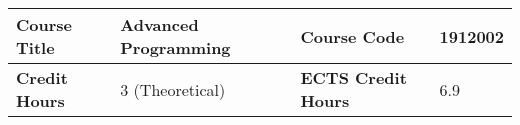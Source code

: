 \documentclass[12pt]{article}
\begin{document}
\begin{minipage}{\textwidth}
\begin{tabularx}{\textwidth}{|l|X|}
\begin{minipage}{.70\textwidth}
					\vspace{3mm}
					\end{minipage} \\ \hline
\end{tabularx}
\end{minipage}


\bigskip
\bigskip



\begin{minipage}{\textwidth}
\begin{tabularx}{\textwidth}{|l|X|l|X|}
\hline
\textbf{Course Title}       &  Advanced Programming & \textbf{Course Code}       &  1912002 \\ \hline
\textbf{Credit Hours}       &   3 (Theoretical) & \textbf{ECTS Credit Hours}       &  6.9 \\ \hline
\end{tabularx}


\end{minipage}
\end{document}
